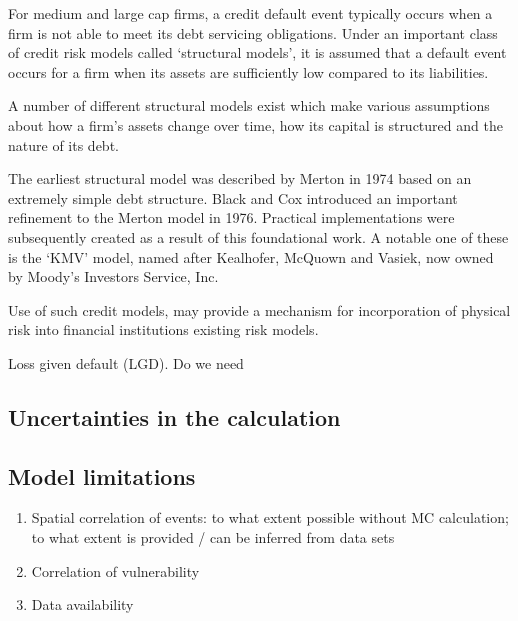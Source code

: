 \documentclass[a4paper,11pt]{extarticle} %
\begin{document}
{For medium and large cap firms, a credit default event typically occurs when a firm is not able to meet its debt servicing obligations. Under an important class of credit risk models called `structural models', it is assumed that a default event occurs for a firm when its assets are sufficiently low compared to its liabilities.

A number of different structural models exist which make various assumptions about how a firm's assets change over time, how its capital is structured and the nature of its debt.

The earliest structural model was described by Merton in 1974 \cite{Merton:1974} based on an extremely simple debt structure. Black and Cox \cite{BlackCox:1976} introduced an important refinement to the Merton model in 1976. Practical implementations were subsequently created as a result of this foundational work. A notable one of these is the `KMV' model, named after Kealhofer, McQuown and Vasiek, now owned by Moody's Investors Service, Inc.

Use of such credit models, may provide a mechanism for incorporation of physical risk into financial institutions existing risk models\cite{KenyonEtAl:2021}.


Loss given default (LGD). Do we need 


\subsection{Uncertainties in the calculation}

\subsection{Model limitations}

\begin{enumerate}
    \item Spatial correlation of events: to what extent possible without MC calculation; to what extent is provided / can be inferred from data sets
    \item Correlation of vulnerability
    \item Data availability
\end{enumerate}


}
\end{document}
